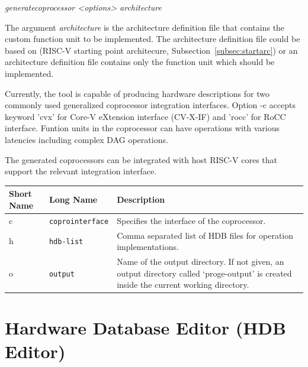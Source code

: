 \documentclass[a4paper,twoside]{tceusermanual}
\begin{document}
\textit{generatecoprocessor <options> architecture}

The argument \textit{architecture} is the architecture definition file that 
contains the custom function unit to be implemented. The architecture 
definition file could be based on  (RISC-V starting point 
architecure, Subsection~\ref{subsec:startarc}) or an architecture definition 
file contains only the function unit which should be implemented.

Currently, the tool is capable of producing hardware descriptions for 
two commonly used generalized coprocessor integration interfaces. Option -c 
accepts keyword 'cvx' for Core-V eXtension interface (CV-X-IF) and 
'rocc' for RoCC interface. Funtion units in the coprocessor can have operations with various 
latencies including complex DAG operations.

The generated coprocessors can be integrated with host RISC-V cores that support the 
relevant integration interface.



\begin{center}
\begin{longtable}[htb]{@{}p{}@{}p{}%
                     @{}p{}}

\textbf{Short Name} &\textbf{Long Name} &\textbf{Description} \\
\hline

c & \verb|coprointerface| &
Specifies the interface of the coprocessor. \\

h & \verb|hdb-list| &
Comma separated list of HDB files for operation implementations.\\

o & \verb|output| &
Name of the output directory. If not given, an output directory called
`proge-output' is created inside the current working directory.
\\
\end{longtable}
\end{center}



\section{Hardware Database Editor (HDB Editor)}
\label{sec:hdbedit}
 
\end{document}
